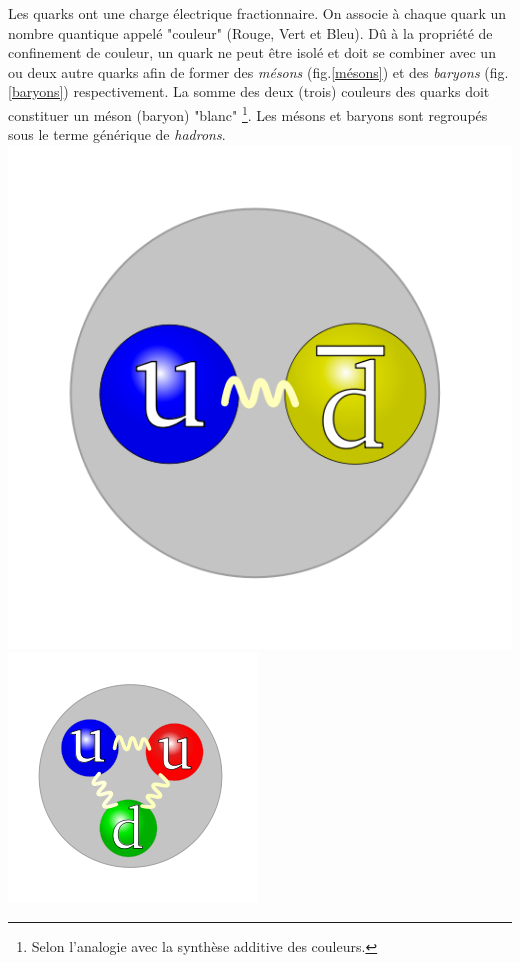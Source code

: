 Les quarks ont une charge électrique fractionnaire. On associe à chaque quark un nombre quantique appelé "couleur" (Rouge, Vert et Bleu). Dû à la propriété de confinement de couleur, un quark ne peut être isolé et doit se combiner avec un ou deux autre quarks afin de former des \textit{mésons} (fig.\ref{mésons}) et des \textit{baryons} (fig.\ref{baryons}) respectivement. La somme des deux (trois) couleurs des quarks doit constituer un méson (baryon) "blanc" \footnote{Selon l'analogie avec la synthèse additive des couleurs.}. Les mésons et baryons sont regroupés sous le terme générique de \textit{hadrons}.
\marginpar
{
\centering
\includegraphics[width=\marginparwidth]{SM/quarks2.png}
\label{mésons}
}
\marginpar
{
	\centering
    \includegraphics[width=\marginparwidth]{SM/quarks.png}
    	\label{baryons}
}	
